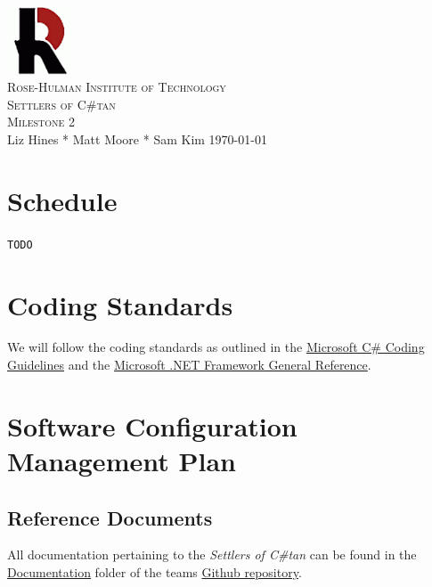 \documentclass[12pt]{article}
\begin{document}
\begin{titlepage}
\begin{center}
\includegraphics[width=0.15\textwidth]{Images/logo}\\[1cm]
\textsc{\LARGE Rose-Hulman Institute of Technology}\\[1.5cm]
\textsc{\Large Settlers of C\#tan}\\[1.0cm]
\textsc{\Large Milestone 2}\\[1.0cm]
\Large Liz Hines \hspace{0.2cm}*\hspace{0.2cm}  Matt Moore \hspace{0.2cm}*\hspace{0.2cm} Sam	Kim
\vfill
\large \today
\end{center}
\end{titlepage}

\newpage
{\small \tableofcontents}
\newpage

\section{Schedule}
\verb!TODO!

\section{Coding Standards}
We will follow the coding standards as outlined in the \href{http://goo.gl/XRoHg}{Microsoft C\# Coding Guidelines} and the \href{http://goo.gl/kuwHu}{Microsoft .NET Framework General Reference}.

\section{Software Configuration Management Plan}
\subsection{Reference Documents}
All documentation pertaining to the \emph{Settlers of C\#tan} can be found in the \href{https://github.com/mooremo/Settlers-of-Catan/tree/master/Documentation}{Documentation} folder of the teams \href{https://github.com/mooremo/Settlers-of-Catan}{Github repository}.
\end{document}
